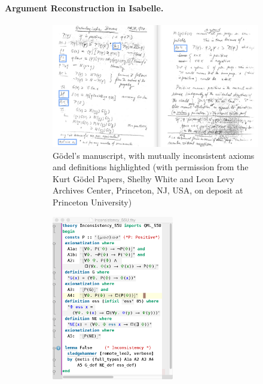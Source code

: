 \documentclass{llncs}
\begin{document}











\pagebreak

\paragraph{Argument Reconstruction in Isabelle.}  \label{sec:arg2}
\begin{figure}[t]
  \centering
  \begin{subfigure}[t]{0.715\textwidth}
    \includegraphics[width=\textwidth]{./Manuscript2.png}
    \caption{G\"{o}del's manuscript, with mutually inconsistent axioms and
      definitions highlighted (with permission from the Kurt G\"odel Papers, Shelby White and Leon Levy Archives Center, Princeton, NJ, USA, on deposit at Princeton University)} \label{GoedelScript} 
  \end{subfigure}
   \begin{subfigure}[t]{0.28\textwidth}
     \includegraphics[width=\textwidth,height=7.2cm]{./Inconsistency_S5U_direct.png}

\end{subfigure}
\end{figure}
\end{document}

